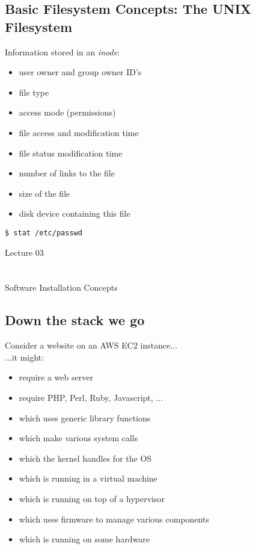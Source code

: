 \documentclass[xga]{xdvislides}
\begin{document}
\subsection{Basic Filesystem Concepts: The UNIX Filesystem}
Information stored in an {\em inode}:
\begin{itemize}
	\item user owner and group owner ID's
	\item file type
	\item access mode (permissions)
	\item file access and modification time
	\item file status modification time
	\item number of links to the file
	\item size of the file
	\item disk device containing this file
\end{itemize}

\begin{verbatim}
$ stat /etc/passwd
\end{verbatim}

\newpage
\vspace*{\fill}
\begin{center}
    \Hugesize
        Lecture 03 \\ [1em]
    \hspace*{5mm}
    \blueline\\
    \hspace*{5mm}\\
	Software Installation Concepts
\end{center}
\vspace*{\fill}

\subsection{Down the stack we go}
Consider a website on an AWS EC2 instance...
\\

...it might:

\begin{itemize}
	\item require a web server
	\item require PHP, Perl, Ruby, Javascript, ...
	\item which uses generic library functions
	\item which make various system calls
	\item which the kernel handles for the OS
	\item which is running in a virtual machine
	\item which is running on top of a hypervisor
	\item which uses firmware to manage various components
	\item which is running on some hardware
\end{itemize}
\end{document}
